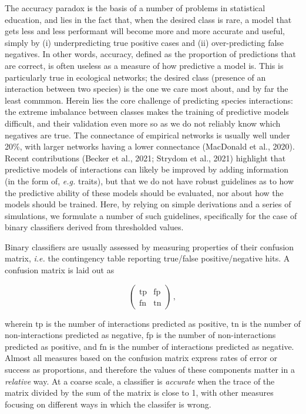 \documentclass[10pt,oneside]{article}
\begin{document}
The accuracy paradox is the basis of a number of problems in statistical
education, and lies in the fact that, when the desired class is rare, a
model that gets less and less performant will become more and more
accurate and useful, simply by (i) underpredicting true positive cases
and (ii) over-predicting false negatives. In other words, accuracy,
defined as the proportion of predictions that are correct, is often
useless as a measure of how predictive a model is. This is particularly
true in ecological networks; the desired class (presence of an
interaction between two species) is the one we care most about, and by
far the least commmon. Herein lies the core challenge of predicting
species interactions: the extreme imbalance between classes makes the
training of predictive models difficult, and their validation even more
so as we do not reliably know which negatives are true. The connectance
of empirical networks is usually well under 20\%, with larger networks
having a lower connectance (MacDonald et al., 2020). Recent
contributions (Becker et al., 2021; Strydom et al., 2021) highlight that
predictive models of interactions can likely be improved by adding
information (in the form of, \emph{e.g.} traits), but that we do not
have robust guidelines as to how the predictive ability of these models
should be evaluated, nor about how the models should be trained. Here,
by relying on simple derivations and a series of simulations, we
formulate a number of such guidelines, specifically for the case of
binary classifiers derived from thresholded values.

Binary classifiers are usually assessed by measuring properties of their
confusion matrix, \emph{i.e.} the contingency table reporting true/false
positive/negative hits. A confusion matrix is laid out as

\[\begin{pmatrix}
    \text{tp} & \text{fp} \\
    \text{fn} & \text{tn}
\end{pmatrix} \,,\]

wherein \(\text{tp}\) is the number of interactions predicted as
positive, \(\text{tn}\) is the number of non-interactions predicted as
negative, \(\text{fp}\) is the number of non-interactions predicted as
positive, and \(\text{fn}\) is the number of interactions predicted as
negative. Almost all measures based on the confusion matrix express
rates of error or success as proportions, and therefore the values of
these components matter in a \emph{relative} way. At a coarse scale, a
classifier is \emph{accurate} when the trace of the matrix divided by
the sum of the matrix is close to 1, with other measures focusing on
different ways in which the classifer is wrong.
\end{document}
